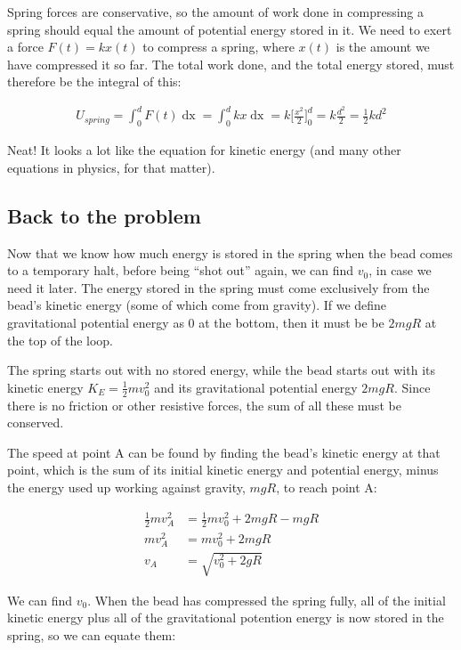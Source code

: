 \documentclass[12pt,a4paper]{report}
\begin{document}
Spring forces are conservative, so the amount of work done in compressing a spring should equal the amount of potential energy stored in it. We need to exert a force $F(t) = k x(t)$ to compress a spring, where $x(t)$ is the amount we have compressed it so far. The total work done, and the total energy stored, must therefore be the integral of this: 

\begin{align}
U_{spring} = \int_0^d F(t) \mathop{dx} = \int_0^d k x \mathop{dx} = k \Big[ \frac{x^2}{2} \Big]_0^d = k \frac{d^2}{2} = \frac{1}{2} k d^2
\end{align}

Neat! It looks a lot like the equation for kinetic energy (and many other equations in physics, for that matter).

\subsection{Back to the problem}

Now that we know how much energy is stored in the spring when the bead comes to a temporary halt, before being ``shot out'' again, we can find $v_0$, in case we need it later. The energy stored in the spring must come exclusively from the bead's kinetic energy (some of which come from gravity). If we define gravitational potential energy as 0 at the bottom, then it must be be $2 m g R$ at the top of the loop.

The spring starts out with no stored energy, while the bead starts out with its kinetic energy $\displaystyle K_E = \frac{1}{2} m v_0^2$ and its gravitational potential energy $2 m g R$. Since there is no friction or other resistive forces, the sum of all these must be conserved.

The speed at point A can be found by finding the bead's kinetic energy at that point, which is the sum of its initial kinetic energy and potential energy, minus the energy used up working against gravity, $m g R$, to reach point A:

\begin{align}
\frac{1}{2} m v_A^2 &= \frac{1}{2} m v_0^2 + 2 m g R - m g R\\
m v_A^2 &= m v_0^2 + 2 m g R\\
v_A &= \sqrt{v_0^2 + 2 g R}
\end{align}

We can find $v_0$. When the bead has compressed the spring fully, all of the initial kinetic energy plus all of the gravitational potention energy is now stored in the spring, so we can equate them:
\end{document}
